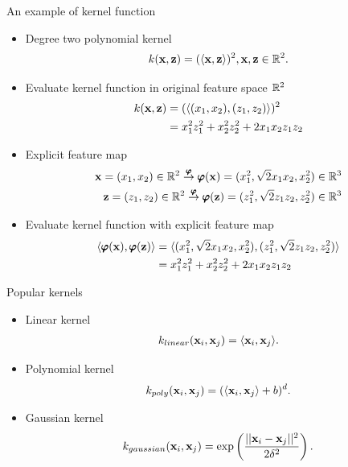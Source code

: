 \documentclass[first=dgreen,second=purple,logo=yellowexc]{aaltoslides}
\begin{document}
{\begin{frame}{An example of kernel function}
	\begin{itemize}
		\item Degree two polynomial kernel
		\begin{align*}
			k(\mathbf {x},\mathbf {z}) = (\langle \mathbf {x}, \mathbf {z} \rangle)^2, \mathbf {x},\mathbf {z}\in\mathbb{R}^2.
		\end{align*} 
		\item Evaluate kernel function in original feature space $\mathbb{R}^2$
		\begin{align*}
			k(\mathbf {x},\mathbf {z}) &= (\langle (x_1,x_2), (z_1,z_2) \rangle)^2 \\
			&= x_1^2z_1^2+x_2^2z_2^2+2x_1x_2z_1z_2 
		\end{align*}
		\item Explicit feature map
		\begin{align*}
			\mathbf {x}=(x_1,x_2)\in\mathbb{R}^2\overset{\pmb \varphi}{\rightarrow}\pmb \varphi(\mathbf {x})=(x_1^2,\sqrt{2}x_1x_2,x_2^2)\in\mathbb{R}^3\\
			\mathbf {z}=(z_1,z_2)\in\mathbb{R}^2\overset{\pmb \varphi}{\rightarrow}\pmb \varphi(\mathbf {z})=(z_1^2,\sqrt{2}z_1z_2,z_2^2)\in\mathbb{R}^3
		\end{align*}
		\item Evaluate kernel function with explicit feature map
		\begin{align*}
			\langle \pmb \varphi(\mathbf {x}), \pmb \varphi(\mathbf {z}) \rangle 
			&= \langle (x_1^2,\sqrt{2}x_1x_2,x_2^2), (z_1^2,\sqrt{2}z_1z_2,z_2^2) \rangle\\
			&= x_1^2z_1^2+x_2^2z_2^2+2x_1x_2z_1z_2
		\end{align*}
		
	\end{itemize}
\end{frame}


\begin{frame}{Popular kernels}
	\begin{itemize}
		\item Linear kernel
		\begin{align*}
			k_{linear}(\mathbf {x}_i,\mathbf {x}_j) = \langle \mathbf {x}_i, \mathbf {x}_j \rangle.
		\end{align*}
		\item Polynomial kernel
		\begin{align*}
			k_{poly}(\mathbf {x}_i,\mathbf {x}_j) = (\langle \mathbf {x}_i, \mathbf {x}_j \rangle + b)^d.
		\end{align*}
		\item Gaussian kernel
		\begin{align*}
			k_{gaussian}(\mathbf {x}_i,\mathbf {x}_j) = \exp\left(\frac{||\mathbf {x}_i-\mathbf {x}_j||^2}{2\delta^2}\right).
		\end{align*}
	\end{itemize}
\end{frame}


}
\end{document}
